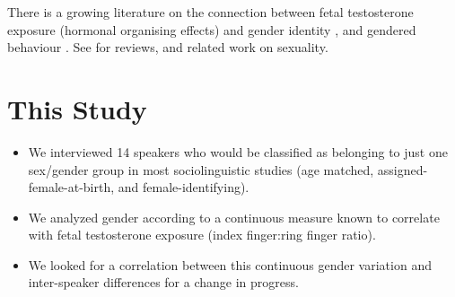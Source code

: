 \documentclass[a0,portrait]{a0poster}
\begin{document}
\begin{multicols}{2}
There is a growing literature on the connection between fetal testosterone exposure (hormonal organising effects) and gender identity \citep{hinesetal2004, berenbaumbailey2003}, and gendered behaviour \citep{hinesetal2002, auyeungetal2009}. See \citet{hines2006, balthazart2011} for reviews, and related work on sexuality.


%
%




\section*{This Study}

\begin{itemize}
	\item We interviewed 14 speakers who would be classified as belonging to just one sex/gender group in most sociolinguistic studies (age matched, assigned-female-at-birth, and female-identifying).
	\item We analyzed gender according to a continuous measure known to correlate with fetal testosterone exposure (index finger:ring finger ratio).
	\item We looked for a correlation between this continuous gender variation and inter-speaker differences for a change in progress.
\end{itemize}


\end{multicols}
\end{document}

